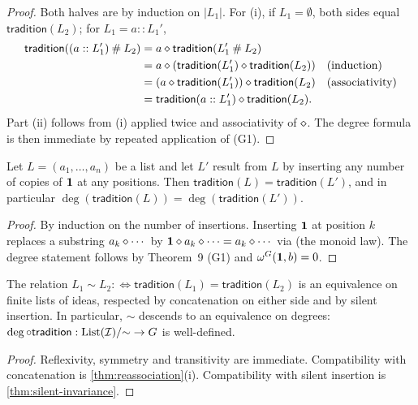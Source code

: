 \begin{proof}
Both halves are by induction on $|L_1|$. For (i), if $L_1 = \emptyset$,
both sides equal $\mathsf{tradition}(L_2)$; for $L_1 = a :: L_1'$,
\begin{align*}
  \mathsf{tradition}((a :: L_1') \mathbin{\#} L_2)
  &= a \mathbin{\diamond} \mathsf{tradition}(L_1' \mathbin{\#} L_2) \\
  &= a \mathbin{\diamond} (\mathsf{tradition}(L_1') \mathbin{\diamond}
       \mathsf{tradition}(L_2))
   \quad\text{(induction)}\\
  &= (a \mathbin{\diamond} \mathsf{tradition}(L_1')) \mathbin{\diamond}
       \mathsf{tradition}(L_2)
   \quad\text{(associativity)}\\
  &= \mathsf{tradition}(a :: L_1') \mathbin{\diamond} \mathsf{tradition}(L_2).
\end{align*}
Part (ii) follows from (i) applied twice and associativity of
$\mathbin{\diamond}$. The degree formula is then immediate by repeated
application of (G1).
\end{proof}

\begin{theorem}
\label{thm:silent-invariance}
Let $L = (a_1,\dots,a_n)$ be a list and let $L'$ result from $L$ by
inserting any number of copies of $\mathbf{1}$ at any positions. Then
$\mathsf{tradition}(L) = \mathsf{tradition}(L')$, and in particular
$\deg(\mathsf{tradition}(L)) = \deg(\mathsf{tradition}(L'))$.
\end{theorem}

\begin{proof}
By induction on the number of insertions. Inserting $\mathbf{1}$ at position
$k$ replaces a substring $a_k\mathbin{\diamond} \cdots$ by $\mathbf{1}\mathbin{\diamond}
a_k\mathbin{\diamond} \cdots = a_k\mathbin{\diamond} \cdots$ via (the monoid law). The
degree statement follows by Theorem~9 (G1) and $\omega^G(\mathbf{1},b) = 0$.
\end{proof}

\begin{corollary}\label{cor:social-cong}
The relation $L_1 \sim L_2 :\Leftrightarrow \mathsf{tradition}(L_1) =
\mathsf{tradition}(L_2)$ is an equivalence on finite lists of ideas,
respected by concatenation on either side and by silent insertion. In
particular, $\sim$ descends to an equivalence on degrees:
$\deg\circ\mathsf{tradition} : \mathrm{List}(\mathcal{I})/{\sim} \to G$ is
well-defined.
\end{corollary}

\begin{proof}
Reflexivity, symmetry and transitivity are immediate. Compatibility
with concatenation is \cref{thm:reassociation}(i). Compatibility with
silent insertion is \cref{thm:silent-invariance}.
\end{proof}

